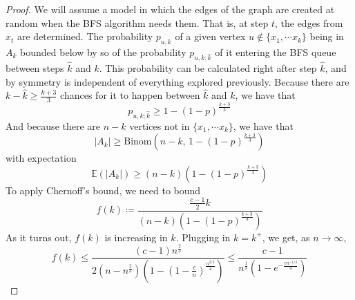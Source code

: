 \documentclass{amsart}
\theoremstyle{plain}
\theoremstyle{definition}
\begin{document}
\begin{proof}
        \noindent We will assume a model in which the edges of the graph are created at
        random when the BFS algorithm needs them.
        That is, at step $t$, the edges from $x_t$ are determined.
        The probability $p_{u, k}$ of a given vertex $u \notin \{x_1, \cdots x_{k}\}$
        being in $A_k$ bounded below by so of the probability $p_{u, k; \hat{k}}$
        of it entering the BFS queue between steps $\hat{k}$ and $k$.
        This probability can be calculated right after step $\hat{k}$,
        and by symmetry is independent of everything explored previously.
        Because there are $k - \hat{k} \geq \frac{k+3}{3}$ chances for it to happen between $\hat{k}$ and $k$,
        we have that
        \begin{equation}
            p_{u, k; \hat{k}} \geq 1 - (1 - p)^{\frac{k+3}{3}}
            \label{eq:equation1}
        \end{equation}
        And because there are $n - k$ vertices not in $\{x_1, \cdots x_k\}$, we have that
        \begin{equation}
            |A_k| \geq \text{Binom}\left(n - k,\, 1 - (1 - p)^{\frac{k+3}{3}}\right)
            \label{eq:equation2}
        \end{equation}
        with expectation
        \begin{equation}
            \mathbb{E}(|A_k|) \geq (n - k)\left(1 - (1 - p)^{\frac{k+3}{3}}\right)
            \label{eq:equation_expec}
        \end{equation}
        To apply Chernoff's bound, we need to bound
        \begin{equation}
            f(k) \coloneqq \frac{\frac{c-1}{2}k}{(n - k)\left(1 - (1 - p)^{\frac{k+3}{3}}\right)}
            \label{eq:f}
        \end{equation}
        As it turns out, $f(k)$ is increasing in $k$. %
        Plugging in $k = k^{+}$, we get, as $n \to \infty$,
        \begin{equation}
            f(k) \leq \frac
            {(c-1)n^{\frac{2}{3}}}
            {2(n-n^{\frac{2}{3}})\left(1 - (1 - \frac{c}{n})^{\frac{n^{2/3}}{4}}\right)}
            \leq \frac{c-1}
            {n^{\frac{1}{3}}\left(1 - e^{-\frac{cn^{-1/3}}{4}}\right)}
            \label{eq:fbound}
        \end{equation}



    \end{proof}
\end{document}
